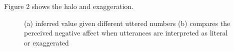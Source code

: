 \documentclass{article} %
\begin{document}
Figure 2 shows the halo and exaggeration.



\begin{figure}[t]
\caption{(a) inferred value given different uttered numbers (b) compares the perceived negative affect when utterances are interpreted as literal or exaggerated}
\end{figure}
\end{document}
